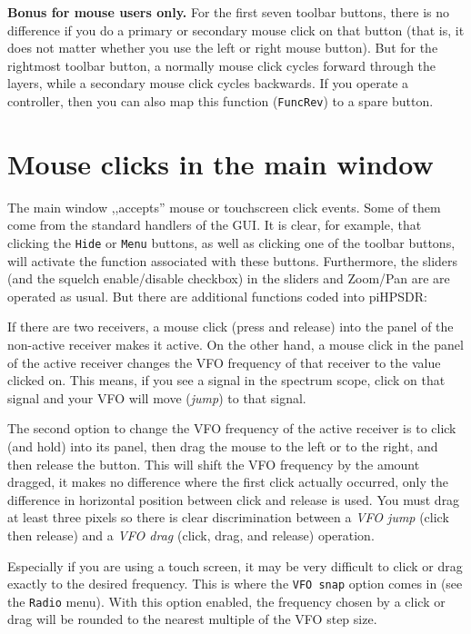 \documentclass[12pt]{book}
\def\rett#1{\texttt{\color{red}#1}}
\def\bltt#1{\texttt{\color{blue}#1}}
\def\pH{pi\-HPSDR\xspace}
\begin{document}
\textbf{Bonus for mouse users only.} For the first seven toolbar buttons,
there is no difference if you do a primary or secondary mouse click on that
button (that is, it does not matter whether you use the left or right mouse
button). But for the rightmost toolbar button, a normally mouse click cycles
forward through the layers, while a secondary mouse click cycles backwards.
If you operate a controller, then you
can also map this function (\bltt{FuncRev}) to a spare button.


\section{Mouse clicks in the main window}
The main window ,,accepts'' mouse or touchscreen click events.
Some of them come from the standard handlers of the GUI. It is
clear, for example, that clicking the \rett{Hide} or
\rett{Menu} buttons, as well as clicking one of the
toolbar buttons, will activate the function associated with
these buttons. Furthermore, the sliders (and the squelch enable/disable
checkbox) in the sliders and Zoom/Pan are are operated as usual.
But there are additional functions coded into \pH:

If there are two receivers, a mouse click (press and release) into
the panel of the non-active receiver makes it active. On the other
hand, a mouse click in the panel of the active receiver changes
the VFO frequency of that receiver to the value clicked on.
This means, if you see a signal in the spectrum scope, click
on that signal and your VFO will move (\textit{jump}) to that signal.

The second option to change the VFO frequency of the active receiver
is to click (and hold) into its panel, then drag the mouse to the left
or to the right, and then release the button. This will shift the
VFO frequency by the amount dragged, it makes no difference
where the first click actually occurred, only the difference
in horizontal position between click and release is used. You must
drag at least three pixels so there is clear discrimination between
a \textit{VFO jump} (click then release) and a \textit{VFO drag} (click, drag,
and release) operation.

Especially if you are using a touch screen, it may be very difficult
to click or drag exactly to the desired frequency. This is where
the \rett{VFO snap} option comes in (see the \bltt{Radio} menu).
With this option enabled, the frequency chosen by a click or drag
will be rounded to the nearest multiple of the VFO step size.
\end{document}
